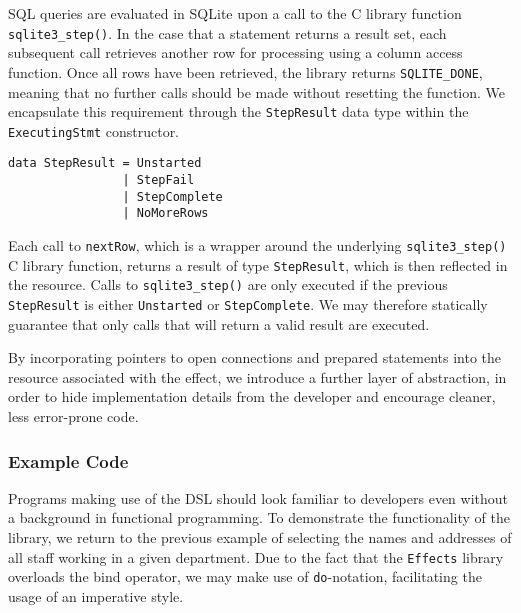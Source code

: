 \documentclass[preprint]{sigplanconf}
\begin{document}
SQL queries are evaluated in SQLite upon a call to the C library function \texttt{sqlite3\_step()}. In the case that a statement returns a result set, each subsequent call retrieves another row for processing using a column access function. Once all rows have been retrieved, the library returns \texttt{SQLITE\_DONE}, meaning that no further calls should be made without resetting the function. We encapsulate this requirement through the \texttt{StepResult} data type within the \texttt{ExecutingStmt} constructor. 
{\small
\begin{verbatim}
data StepResult = Unstarted
                | StepFail
                | StepComplete
                | NoMoreRows
\end{verbatim}
}
Each call to \texttt{nextRow}, which is a wrapper around the underlying \texttt{sqlite3\_step()} C library function, returns a result of type \texttt{StepResult}, which is then reflected in the resource. Calls to \texttt{sqlite3\_step()} are only executed if the previous \texttt{StepResult} is either \texttt{Unstarted} or \texttt{StepComplete}. We may therefore statically guarantee that only calls that will return a valid result are executed. 

By incorporating pointers to open connections and prepared statements into the resource associated with the effect, we introduce a further layer of abstraction, in order to hide implementation details from the developer and encourage cleaner, less error-prone code. 

\subsubsection{Example Code}
Programs making use of the DSL should look familiar to developers even without a background in functional programming. To demonstrate the functionality of the library, we return to the previous example of selecting the names and addresses of all staff working in a given department. Due to the fact that the \texttt{Effects} library overloads the bind operator, we may make use of \texttt{do}-notation, facilitating the usage of an imperative style.
\end{document}
